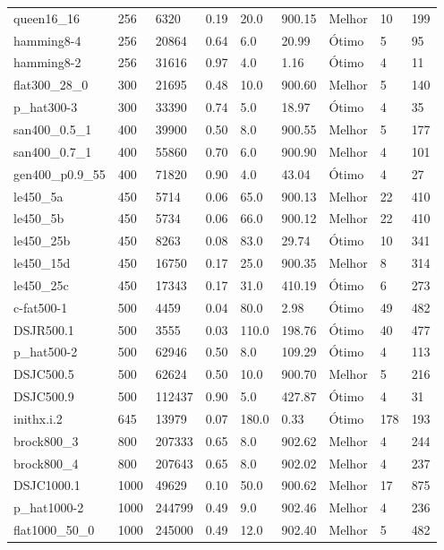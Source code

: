 \begin{table}[h!]
{\begin{tabular}{lllllllll}
			queen16\_16 & 256 & 6320 & 0.19 & 20.0 & 900.15 & Melhor & 10 & 199 \\
			hamming8-4 & 256 & 20864 & 0.64 & 6.0 & 20.99 & Ótimo & 5 & 95 \\
			hamming8-2 & 256 & 31616 & 0.97 & 4.0 & 1.16 & Ótimo & 4 & 11 \\
			flat300\_28\_0 & 300 & 21695 & 0.48 & 10.0 & 900.60 & Melhor & 5 & 140 \\
			p\_hat300-3 & 300 & 33390 & 0.74 & 5.0 & 18.97 & Ótimo & 4 & 35 \\
			san400\_0.5\_1 & 400 & 39900 & 0.50 & 8.0 & 900.55 & Melhor & 5 & 177 \\
			san400\_0.7\_1 & 400 & 55860 & 0.70 & 6.0 & 900.90 & Melhor & 4 & 101 \\
			gen400\_p0.9\_55 & 400 & 71820 & 0.90 & 4.0 & 43.04 & Ótimo & 4 & 27 \\
			le450\_5a & 450 & 5714 & 0.06 & 65.0 & 900.13 & Melhor & 22 & 410 \\
			le450\_5b & 450 & 5734 & 0.06 & 66.0 & 900.12 & Melhor & 22 & 410 \\
			le450\_25b & 450 & 8263 & 0.08 & 83.0 & 29.74 & Ótimo & 10 & 341 \\
			le450\_15d & 450 & 16750 & 0.17 & 25.0 & 900.35 & Melhor & 8 & 314 \\
			le450\_25c & 450 & 17343 & 0.17 & 31.0 & 410.19 & Ótimo & 6 & 273 \\
			c-fat500-1 & 500 & 4459 & 0.04 & 80.0 & 2.98 & Ótimo & 49 & 482 \\
			DSJR500.1 & 500 & 3555 & 0.03 & 110.0 & 198.76 & Ótimo & 40 & 477 \\
			p\_hat500-2 & 500 & 62946 & 0.50 & 8.0 & 109.29 & Ótimo & 4 & 113 \\
			DSJC500.5 & 500 & 62624 & 0.50 & 10.0 & 900.70 & Melhor & 5 & 216 \\
			DSJC500.9 & 500 & 112437 & 0.90 & 5.0 & 427.87 & Ótimo & 4 & 31 \\
			inithx.i.2 & 645 & 13979 & 0.07 & 180.0 & 0.33 & Ótimo & 178 & 193 \\
			brock800\_3 & 800 & 207333 & 0.65 & 8.0 & 902.62 & Melhor & 4 & 244 \\
			brock800\_4 & 800 & 207643 & 0.65 & 8.0 & 902.02 & Melhor & 4 & 237 \\
			DSJC1000.1 & 1000 & 49629 & 0.10 & 50.0 & 900.62 & Melhor & 17 & 875 \\
			p\_hat1000-2 & 1000 & 244799 & 0.49 & 9.0 & 902.46 & Melhor & 4 & 236 \\
			flat1000\_50\_0 & 1000 & 245000 & 0.49 & 12.0 & 902.40 & Melhor & 5 & 482 \\

\end{tabular}}
\end{table}
